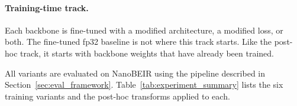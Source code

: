 \paragraph{Training-time track.} Each backbone is fine-tuned with a modified
architecture, a modified loss, or both. The fine-tuned fp32 baseline is not
where this track starts. Like the post-hoc track, it starts with backbone
weights that have already been trained.

All variants are evaluated on NanoBEIR using the pipeline described in
Section~\ref{sec:eval_framework}. Table~\ref{tab:experiment_summary} lists the
six training variants and the post-hoc transforms applied to each.

\begin{table}[H]
  \centering
  \caption[Summary of training variants and applicable post-hoc transforms.]{Summary of training variants. Each variant is a complete fine-tuning run from a pre-trained backbone. Post-hoc transforms are applied after training with no weight modification.}
  \label{tab:experiment_summary}
\end{table}


